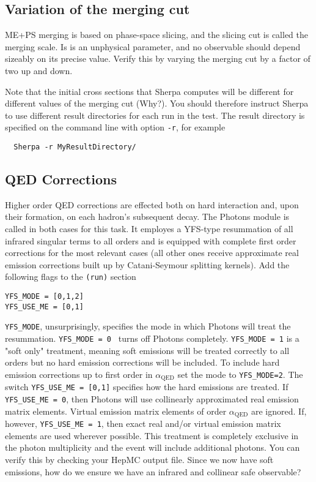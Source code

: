 \documentclass[10pt]{article}
\begin{document}
\subsection{Variation of the merging cut}

ME+PS merging is based on phase-space slicing, and the slicing cut is called 
the merging scale. Is is an unphysical parameter, and no observable should
depend sizeably on its precise value. Verify this by varying the merging
cut by a factor of two up and down.

Note that the initial cross sections that Sherpa computes will be different 
for different values of the merging cut (Why?). You should therefore instruct 
Sherpa to use different result directories for each run in the test. 
The result directory is specified on the command line with option {\tt -r},
for example
\begin{verbatim}
  Sherpa -r MyResultDirectory/
\end{verbatim}

\subsection{QED Corrections}
Higher order QED corrections are effected both on hard interaction and, upon their 
formation, on each hadron’s subsequent decay. The Photons module is called 
in both cases for this task. It employes a YFS-type resummation of all 
infrared singular terms to all orders and is equipped with complete first order 
corrections for the most relevant cases (all other ones receive approximate 
real emission corrections built up by Catani-Seymour splitting kernels).
Add the following flags to the {\tt (run)} section
\begin{verbatim}
YFS_MODE = [0,1,2]
YFS_USE_ME = [0,1]
\end{verbatim}
{\tt YFS\_MODE}, unsurprisingly, specifies the mode in which Photons will
treat the resummation. {\tt YFS\_MODE = 0 } turns off Photons completely.
{\tt YFS\_MODE = 1} is a "soft only" treatment, meaning soft emissions 
will be treated correctly to all orders but no hard emission corrections 
will be included. 
To include hard emission corrections up to first order in $\alpha_{\text{QED}}$
set the mode to {\tt YFS\_MODE=2}.
The switch {\tt YFS\_USE\_ME = [0,1]} specifies how the hard emissions 
are treated. If {\tt YFS\_USE\_ME = 0}, then Photons will use 
collinearly approximated real emission matrix elements. Virtual emission 
matrix elements of order $\alpha_{\text{QED}}$ are ignored. If, however, {\tt YFS\_USE\_ME = 1}, 
then exact real and/or virtual emission matrix elements are used wherever
 possible.
This treatment is completely exclusive in the photon multiplicity and 
the event will include additional photons. You can verify this by 
checking your HepMC output file. Since we now have soft emissions, how
do we ensure we have an infrared and collinear safe observable?
\end{document}
